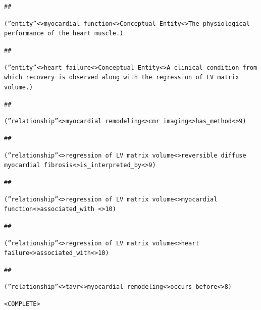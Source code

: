 \documentclass[10pt]{article}
\begin{document}
\begin{appendices}
\begin{tcolorbox}
\texttt{\#\#}

\texttt{(''entity''\textless\textbar\textgreater myocardial function\textless\textbar\textgreater Conceptual Entity\textless\textbar\textgreater The physiological performance of the heart muscle.)}

\texttt{\#\#}

\texttt{(''entity''\textless\textbar\textgreater heart failure\textless\textbar\textgreater Conceptual Entity\textless\textbar\textgreater A clinical condition from which recovery is observed along with the regression of LV matrix volume.)}

\texttt{\#\#}

\vspace{1em}

\texttt{(''relationship''\textless\textbar\textgreater myocardial remodeling\textless\textbar\textgreater cmr imaging\textless\textbar\textgreater has\_method\textless\textbar\textgreater9)}

\texttt{\#\#}

\texttt{(''relationship''\textless\textbar\textgreater regression of LV matrix volume\textless\textbar\textgreater reversible diffuse myocardial fibrosis\textless\textbar\textgreater is\_interpreted\_by\textless\textbar\textgreater9)}

\texttt{\#\#}

\texttt{(''relationship''\textless\textbar\textgreater regression of LV matrix volume\textless\textbar\textgreater myocardial function\textless\textbar\textgreater associated\_with
\textless\textbar\textgreater10)}

\texttt{\#\#}

\texttt{(''relationship''\textless\textbar\textgreater regression of LV matrix volume\textless\textbar\textgreater heart failure\textless\textbar\textgreater associated\_with\textless\textbar\textgreater10)}

\texttt{\#\#}

\texttt{(''relationship''\textless\textbar\textgreater tavr\textless\textbar\textgreater myocardial remodeling\textless\textbar\textgreater occurs\_before\textless\textbar\textgreater8)}

\texttt{\textless\textbar COMPLETE\textbar \textgreater}

\end{tcolorbox}


\begin{tcolorbox}[
    title=E3: GraphRAG Query Prompt,
    halign title=center,
  colback=white,        %
  colframe=blue,       %
  breakable,
  boxrule=0.8pt,        %
  arc=4mm,              %
  left=4pt,             %
  right=4pt,            %
  top=4pt,              %
  bottom=4pt,            %
  fontupper=\small
]
\label{prompt:GraphRAG-query}


\end{tcolorbox}
\end{appendices}
\end{document}
